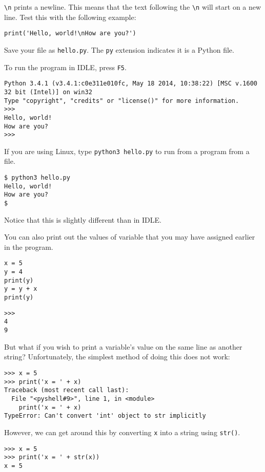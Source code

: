 \documentclass[12pt,hidelinks]{article}
\begin{document}
\texttt{\textbackslash n} prints a newline. This means that the text following
the \texttt{\textbackslash n} will start on a new line. Test this with the
following example:
\begin{lstlisting}[style=python]
print('Hello, world!\nHow are you?')
\end{lstlisting}

Save your file as \texttt{hello.py}. The \texttt{py} extension indicates it is a
Python file.

To run the program in IDLE, press \texttt{F5}. 
\begin{lstlisting}[style=bash]
Python 3.4.1 (v3.4.1:c0e311e010fc, May 18 2014, 10:38:22) [MSC v.1600 32 bit (Intel)] on win32
Type "copyright", "credits" or "license()" for more information.
>>> 
Hello, world!
How are you?
>>> 
\end{lstlisting}

If you are using Linux, type \texttt{python3 hello.py} to run from a program
from a file.
\begin{lstlisting}[style=bash]
$ python3 hello.py
Hello, world!
How are you?
$
\end{lstlisting}
Notice that this is slightly different than in IDLE.

You can also print out the values of variable that you may have assigned earlier
in the program.
\begin{lstlisting}[style=python]
x = 5
y = 4
print(y)
y = y + x
print(y)
\end{lstlisting}

\begin{lstlisting}[style=bash]
>>> 
4
9
\end{lstlisting}

But what if you wish to print a variable's value on the same line as another string? Unfortunately, the simplest method of doing this does not work:

\begin{lstlisting}[style=bash]
>>> x = 5
>>> print('x = ' + x)
Traceback (most recent call last):
  File "<pyshell#9>", line 1, in <module>
    print('x = ' + x)
TypeError: Can't convert 'int' object to str implicitly
\end{lstlisting}

However, we can get around this by converting \texttt{x} into a string using \texttt{str()}.

\begin{lstlisting}[style=bash]
>>> x = 5
>>> print('x = ' + str(x))
x = 5
\end{lstlisting}
\end{document}
